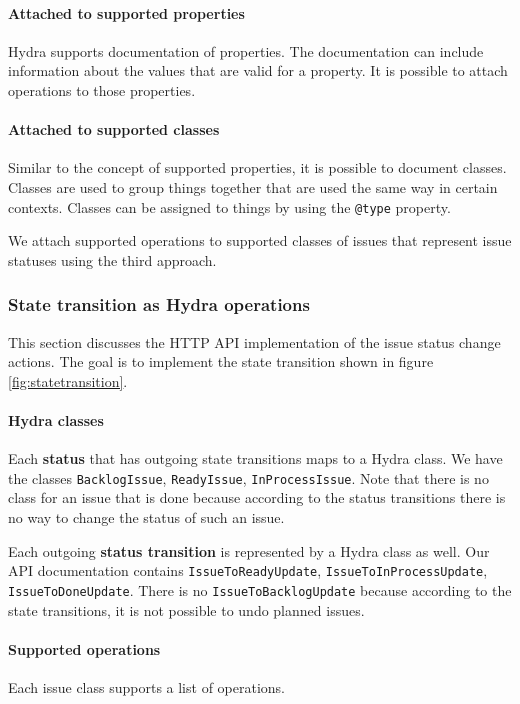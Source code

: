 \paragraph{Attached to supported properties}
Hydra supports documentation of properties. The documentation can include information about the values that are valid for a property. It is possible to attach operations to those properties.

\paragraph{Attached to supported classes}
Similar to the concept of supported properties, it is possible to document classes. Classes are used to group things together that are used the same way in certain contexts. Classes can be assigned to things by using the \lstinline{@type} property.

We attach supported operations to supported classes of issues that represent issue statuses using the third approach.

\subsubsection{State transition as Hydra operations}
This section discusses the HTTP API implementation of the issue status change actions. The goal is to implement the state transition shown in figure \ref{fig:statetransition}.

\paragraph{Hydra classes}\label{par:classes}
Each \textbf{status} that has outgoing state transitions maps to a Hydra class. We have the classes \lstinline{BacklogIssue}, \lstinline{ReadyIssue}, \lstinline{InProcessIssue}. Note that there is no class for an issue that is done because according to the status transitions there is no way to change the status of such an issue.

Each outgoing \textbf{status transition} is represented by a Hydra class as well. Our API documentation contains \lstinline{IssueToReadyUpdate}, \lstinline{IssueToInProcessUpdate}, \lstinline{IssueToDoneUpdate}. There is no \lstinline{IssueToBacklogUpdate} because according to the state transitions, it is not possible to undo planned issues.

\paragraph{Supported operations}
Each issue class supports a list of operations.

